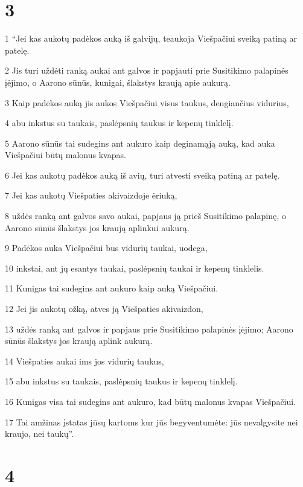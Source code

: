 \chapter{3}


\par 1 “Jei kas aukotų padėkos auką iš galvijų, teaukoja Viešpačiui sveiką patiną ar patelę. 
\par 2 Jis turi uždėti ranką aukai ant galvos ir papjauti prie Susitikimo palapinės įėjimo, o Aarono sūnūs, kunigai, šlakstys kraują apie aukurą. 
\par 3 Kaip padėkos auką jis aukos Viešpačiui visus taukus, dengiančius vidurius, 
\par 4 abu inkstus su taukais, paslėpsnių taukus ir kepenų tinklelį. 
\par 5 Aarono sūnūs tai sudegins ant aukuro kaip deginamąją auką, kad auka Viešpačiui būtų malonus kvapas. 
\par 6 Jei kas aukotų padėkos auką iš avių, turi atvesti sveiką patiną ar patelę. 
\par 7 Jei kas aukotų Viešpaties akivaizdoje ėriuką, 
\par 8 uždės ranką ant galvos savo aukai, papjaus ją prieš Susitikimo palapinę, o Aarono sūnūs šlakstys jos kraują aplinkui aukurą. 
\par 9 Padėkos auka Viešpačiui bus vidurių taukai, uodega, 
\par 10 inkstai, ant jų esantys taukai, paslėpsnių taukai ir kepenų tinklelis. 
\par 11 Kunigas tai sudegins ant aukuro kaip auką Viešpačiui. 
\par 12 Jei jis aukotų ožką, atves ją Viešpaties akivaizdon, 
\par 13 uždės ranką ant galvos ir papjaus prie Susitikimo palapinės įėjimo; Aarono sūnūs šlakstys jos kraują aplink aukurą. 
\par 14 Viešpaties aukai ims jos vidurių taukus, 
\par 15 abu inkstus su taukais, paslėpsnių taukus ir kepenų tinklelį. 
\par 16 Kunigas visa tai sudegins ant aukuro, kad būtų malonus kvapas Viešpačiui. 
\par 17 Tai amžinas įstatas jūsų kartoms kur jūs begyventumėte: jūs nevalgysite nei kraujo, nei taukų”.



\chapter{4}

